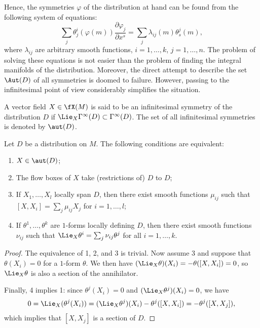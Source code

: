 Hence, the symmetries $\varphi$ of the distribution at hand can be found from the following system of equations:
\[\sum_j \theta^{i}_j(\varphi(m))\frac{\partial\varphi_j}{\partial x^s}=\sum_j\lambda_{ij}(m)\theta^{j}_s(m),\]
where $\lambda_{ij}$ are arbitrary smooth functions, $i=1,\ldots,k$, $j=1,\ldots,n$. The problem of solving these equations is not easier than the problem of finding the integral manifolds of the distribution. Moreover, the direct attempt to describe the set $\Aut(D)$ of all symmetries is doomed to failure. However, passing to the infinitesimal point of view considerably simplifies the situation.

\begin{defn}
    A vector field $X\in\fX(M)$ is said to be an infinitesimal symmetry of the distribution $D$ if $\Lie_X \Gamma^\infty(D)\subset\Gamma^\infty(D)$. The set of all infinitesimal symmetries is denoted by $\aut(D)$.
\end{defn}

\begin{thm}\label{thm 3.1 Kras}
    Let $D$ be a distribution on $M$. The following conditions are equivalent:
    \begin{enumerate}
        \item $X\in\aut(D)$;
        \item The flow boxes of $X$ take (restrictions of) $D$ to $D$;
        \item If $X_1,\ldots,X_l$ locally span $D$, then there exist smooth functions $\mu_{ij}$ such that $[X,X_i]=\sum_j\mu_{ij}X_j$ for $i=1,\ldots,l$;
        \item If $\theta^1,\ldots,\theta^k$ are $1$-forms locally defining $D$, then there exist smooth functions $\nu_{ij}$ such that $\Lie_X \theta^i=\sum_j\nu_{ij}\theta^j$ for all $i=1,\ldots,k$.
    \end{enumerate}
\end{thm}
\begin{proof}
    The equivalence of 1, 2, and 3 is trivial. Now assume 3 and suppose that $\theta(X_i)=0$ for a $1$-form $\theta$. We then have $(\Lie_X\theta)(X_i)=-\theta([X,X_i])=0$,
    so $\Lie_X\theta$ is also a section of the annihilator.

    Finally, 4 implies 1: since $\theta^j(X_i)=0$ and $(\Lie_X\theta^j)(X_i)=0$, we have 
    \[0=\Lie_X(\theta^j(X_i))=(\Lie_X\theta^j)(X_i)-\theta^j([X,X_i])=-\theta^j([X,X_j]),\]
    which implies that $[X,X_j]$ is a section of $D$.
\end{proof}

